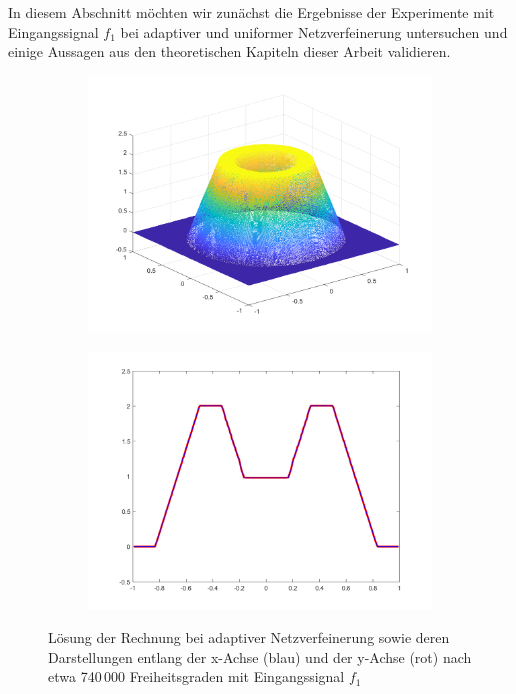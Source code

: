 In diesem Abschnitt möchten wir zunächst die Ergebnisse der Experimente mit
Eingangssignal $f_1$ bei adaptiver und uniformer Netzverfeinerung untersuchen
und einige Aussagen aus den theoretischen Kapiteln dieser Arbeit validieren.
\begin{figure}[p]
  \centering
  \begin{subfigure}[b]{.48\linewidth}
    \centering
    \includegraphics[trim = 40 30 30 30, clip, width=\linewidth]
      {pictures/chapExperiments/secExactSol/f01/adaptive/lvl14/solution.png}
    \label{fig:f01SolAdaptivePlot}
  \end{subfigure}
  \quad
  \begin{subfigure}[b]{.48\linewidth}
    \centering
    \includegraphics[trim = 50 30 50 20, clip, width=\linewidth]
      {pictures/chapExperiments/secExactSol/f01/adaptive/lvl14/solutionAxis.png}
    \label{fig:f01SolAdaptiveAxis}
  \end{subfigure}
  \caption{Lösung der Rechnung bei adaptiver Netzverfeinerung sowie deren
  Darstellungen entlang der x-Achse (blau) und der y-Achse (rot) nach etwa
  740\,000 Freiheitsgraden mit Eingangssignal $f_1$ }
  \label{fig:f01SolAdaptive}
\end{figure}

